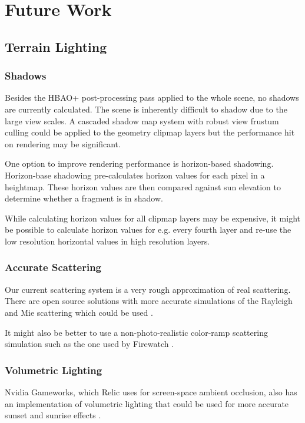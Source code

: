 
\chapter{Future Work} \label{futurework}

\section{Terrain Lighting}

\subsection{Shadows}

Besides the HBAO+ post-processing pass applied to the whole scene, no shadows are currently calculated.
The scene is inherently difficult to shadow due to the large view scales.
A cascaded shadow map system with robust view frustum culling could be applied to the geometry clipmap layers but the performance hit on rendering may be significant.

One option to improve rendering performance is horizon-based shadowing.
Horizon-base shadowing pre-calculates horizon values for each pixel in a heightmap.
These horizon values are then compared against sun elevation to determine whether a fragment is in shadow.

While calculating horizon values for all clipmap layers may be expensive, it might be possible to calculate horizon values for e.g. every fourth layer and re-use the low resolution horizontal values in high resolution layers.


\subsection{Accurate Scattering}

Our current scattering system is a very rough approximation of real scattering.
There are open source solutions with more accurate simulations of the Rayleigh and Mie scattering which could be used \cite{atmosphere}.

It might also be better to use a non-photo-realistic color-ramp scattering simulation such as the one used by Firewatch \cite{firewatch_fog}.


\subsection{Volumetric Lighting}

Nvidia Gameworks, which Relic uses for screen-space ambient occlusion, also has an implementation of volumetric lighting that could be used for more accurate sunset and sunrise effects \cite{nvidia_volumetric}.


